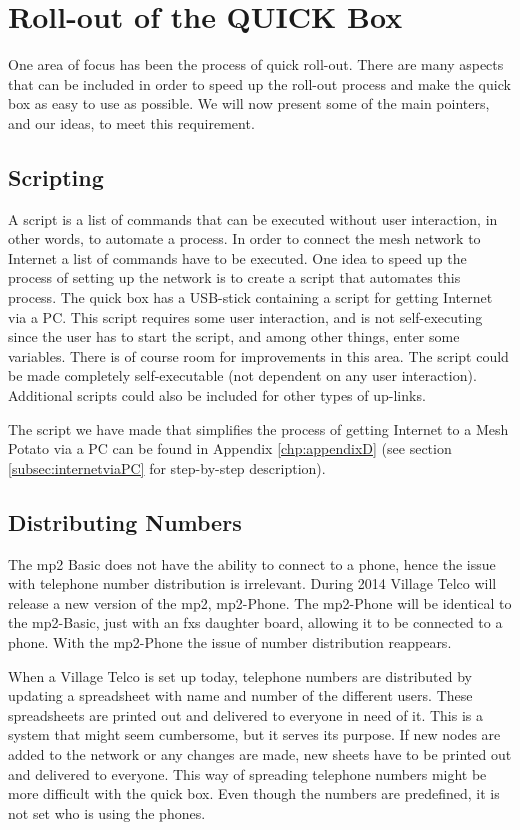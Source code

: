 \chapter{Roll-out of the QUICK Box}
\label{chp:manuals} 

One area of focus has been the process of quick roll-out. There are many aspects that can be included in order to speed up the roll-out process and make the \gls{quick} box as easy to use as possible. We will now present some of the main pointers, and our ideas, to meet this requirement.


\section{Scripting}
A script is a list of commands that can be executed without user interaction, in other words, to automate a process. In order to connect the mesh network to Internet a list of commands have to be executed. One idea to speed up the process of setting up the network is to create a script that automates this process. The \gls{quick} box has a USB-stick containing a script for getting Internet via a PC. This script requires some user interaction, and is not self-executing since the user has to start the script, and among other things, enter some variables. There is of course room for improvements in this area. The script could be made completely self-executable (not dependent on any user interaction). Additional scripts could also be included for other types of up-links. 

The script we have made that simplifies the process of getting Internet to a Mesh Potato via a PC can be found in Appendix \ref{chp:appendixD} (see section \ref{subsec:internetviaPC} for step-by-step description). 

\section{Distributing Numbers}
The \gls{mp2} Basic does not have the ability to connect to a phone, hence the issue with telephone number distribution is irrelevant. During 2014 Village Telco will release a new version of the \gls{mp2}, \gls{mp2}-Phone. The \gls{mp2}-Phone will be identical to the \gls{mp2}-Basic, just with an \gls{fxs} daughter board, allowing it to be connected to a phone. With the \gls{mp2}-Phone the issue of number distribution reappears. 

When a Village Telco is set up today, telephone numbers are distributed by updating a spreadsheet with name and number of the different users. These spreadsheets are printed out and delivered to everyone in need of it. This is a system that might seem cumbersome, but it serves its purpose. If new nodes are added to the network or any changes are made, new sheets have to be printed out and delivered to everyone. This way of spreading telephone numbers might be more difficult with the \gls{quick} box. Even though the numbers are predefined, it is not set who is using the phones.  


